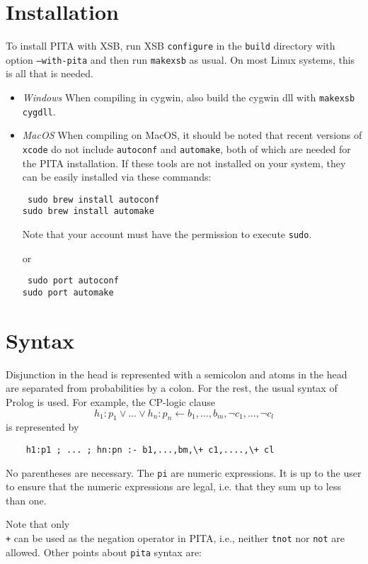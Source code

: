 \section{Installation}

To install PITA with XSB, run XSB \texttt{configure} in the
\texttt{build} directory with option \texttt{--with-pita} and then run
\texttt{makexsb} as usual.  On most Linux systems, this is all that is
needed.

\begin{itemize}
\item {\em Windows} When compiling in cygwin, also build the cygwin
  dll with \texttt{makexsb cygdll}.

\item {\em MacOS} When compiling on MacOS, it should be noted that
  recent versions of {\tt xcode} do not include {\tt autoconf} and
  {\tt automake}, both of which are needed for the PITA installation.
  If these tools are not installed on your system, they can be
  easily installed via these commands:

{\tt 
\noindent
sudo brew install autoconf \\
sudo brew install automake
}

Note that your account must have the permission to execute \texttt{sudo}. 

\noindent
or 

{\tt 
\noindent
sudo port autoconf \\
sudo port automake
}
\end{itemize}

\section{Syntax} \label{sec:pita-syntax}

Disjunction in the head is represented with a semicolon and atoms in the head are separated from probabilities by a colon. For the rest, the usual syntax of Prolog is used.
For example, the  CP-logic clause
$$h_1:p_1\vee \ldots \vee h_n:p_n\leftarrow b_1,\dots,b_m ,\neg c_1,\ldots,\neg c_l$$
is represented by
\begin{verbatim}
    h1:p1 ; ... ; hn:pn :- b1,...,bm,\+ c1,....,\+ cl
\end{verbatim}
No parentheses are necessary. The \texttt{pi} are numeric
expressions. It is up to the user to ensure that the numeric
expressions are legal, i.e. that they sum up to less than one.

Note that only \texttt{\\+} can be used as the negation operator in PITA,
i.e., neither \texttt{tnot}  nor \texttt{not} are allowed.
Other points about {\tt pita} syntax are: 

